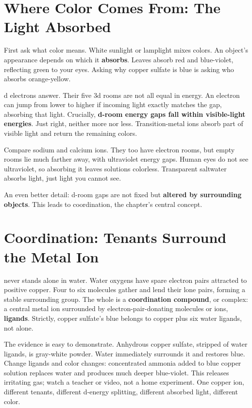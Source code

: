 \section{Where Color Comes From: The Light Absorbed}

First ask what color means. White sunlight or lamplight mixes colors. An object's appearance depends on which it \textbf{absorbs}. Leaves absorb red and blue-violet, reflecting green to your eyes. Asking why copper sulfate is blue is asking who absorbs orange-yellow.

d electrons answer. Their five 3d rooms are not all equal in energy. An electron can jump from lower to higher if incoming light exactly matches the gap, absorbing that light. Crucially, \textbf{d-room energy gaps fall within visible-light energies}. Just right, neither more nor less. Transition-metal ions absorb part of visible light and return the remaining colors.

Compare sodium and calcium ions. They too have electron rooms, but empty rooms lie much farther away, with ultraviolet energy gaps. Human eyes do not see ultraviolet, so absorbing it leaves solutions colorless. Transparent saltwater absorbs light, just light you cannot see.

An even better detail: d-room gaps are not fixed but \textbf{altered by surrounding objects}. This leads to coordination, the chapter's central concept.

\section{Coordination: Tenants Surround the Metal Ion}

 never stands alone in water. Water oxygens have spare electron pairs attracted to positive copper. Four to six molecules gather and lend their lone pairs, forming a stable surrounding group. The whole is a \textbf{coordination compound}, or complex: a central metal ion surrounded by electron-pair-donating molecules or ions, \textbf{ligands}. Strictly, copper sulfate's blue belongs to copper plus six water ligands, not  alone.

The evidence is easy to demonstrate. Anhydrous copper sulfate, stripped of water ligands, is gray-white powder. Water immediately surrounds it and restores blue. Change ligands and color changes: concentrated ammonia added to blue copper solution replaces water and produces much deeper blue-violet. This releases irritating gas; watch a teacher or video, not a home experiment. One copper ion, different tenants, different d-energy splitting, different absorbed light, different color.

